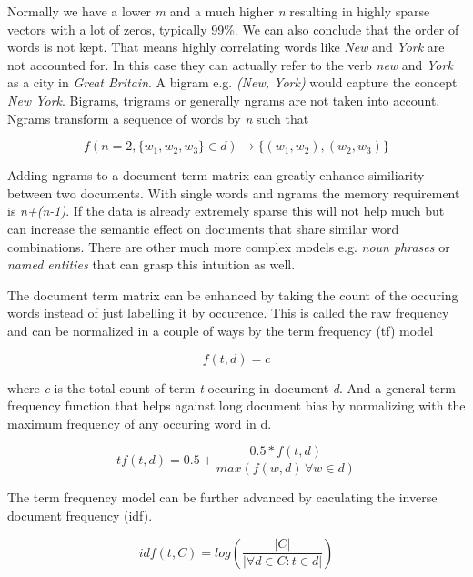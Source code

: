     Normally we have a lower \emph{m} and a much higher \emph{n} resulting in highly sparse vectors with a lot of zeros, typically 99\%. We can also conclude that the order of words is not kept. That means highly correlating words like \emph{New} and \emph{York} are not accounted for. In this case they can actually refer to the verb \emph{new} and \emph{York} as a city in \emph{Great Britain}. A bigram e.g. \emph{(New, York)} would capture the concept \emph{New York}. Bigrams, trigrams or generally ngrams are not taken into account. Ngrams transform a sequence of words by \emph{n} such that 

      \begin{equation}
        f(n = 2, \{w_1, w_2, w_3\} \in d) \to \{(w_1, w_2),(w_2,w_3)\}
      \end{equation}

    Adding ngrams to a document term matrix can greatly enhance similiarity between two documents. With single words and ngrams the memory requirement is \emph{n+(n-1)}. If the data is already extremely sparse this will not help much but can increase the semantic effect on documents that share similar word combinations. There are other much more complex models e.g. \emph{noun phrases} or \emph{named entities} that can grasp this intuition as well.

    The document term matrix can be enhanced by taking the count of the occuring words instead of just labelling it by occurence. This is called the raw frequency and can be normalized in a couple of ways by the term frequency (tf) model
     
      \begin{equation}
        f(t,d) = c
      \end{equation}

    where \emph{c} is the total count of term \emph{t} occuring in document \emph{d}.
    And a general term frequency function that helps against long document bias by normalizing with the maximum frequency of any occuring word in d.

    \begin{equation}
      tf(t,d) = 0.5 + \frac{0.5 * f(t,d)}{max(f(w,d)\, \forall w \in d)}
    \end{equation}

    The term frequency model can be further advanced by caculating the inverse document frequency (idf).

    \begin{equation}
      idf(t, C) = log(\frac{|C|}{|\forall d \in C : t \in d|})
    \end{equation}

